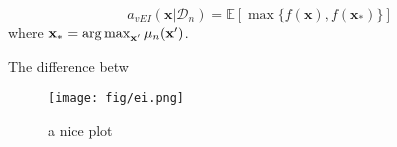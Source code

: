 \begin{definition}[vEI]
    \begin{equation*}
        a_{vEI}(\mathbf{x} | \mathcal{D}_n) = \mathbb{E}[\max \{ f(\mathbf{x}), f(\mathbf{x}_*) \}]
    \end{equation*}
    where $\mathbf{x}_* = \operatorname*{arg\,max}_{\mathbf{x'}} \mu_n(\mathbf{x'})$.
\end{definition}

The difference betw

\begin{figure}[h]
    \centering
    \texttt{[image: fig/ei.png]}
    \caption{a nice plot}
    \label{fig:ei}
\end{figure}
